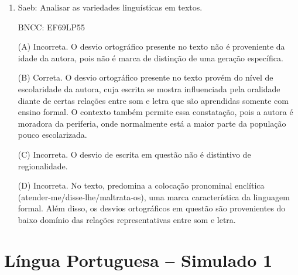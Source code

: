 \begin{enumerate}
\item

Saeb: Analisar as variedades linguísticas em textos.

BNCC: EF69LP55

(A) Incorreta. O desvio ortográfico presente no texto não é proveniente
da idade da autora, pois não é marca de distinção de uma geração
específica.

(B) Correta. O desvio ortográfico presente no texto provém do nível de
escolaridade da autora, cuja escrita se mostra influenciada pela
oralidade diante de certas relações entre som e letra que são aprendidas
somente com ensino formal. O contexto também permite essa constatação,
pois a autora é moradora da periferia, onde normalmente está a maior
parte da população pouco escolarizada.

(C) Incorreta. O desvio de escrita em questão não é distintivo de
regionalidade.

(D) Incorreta. No texto, predomina a colocação pronominal enclítica
(atender-me/disse-lhe/maltrata-os), uma marca característica da
linguagem formal. Além disso, os desvios ortográficos em questão são
provenientes do baixo domínio das relações representativas entre som e
letra.
\end{enumerate}

\section*{Língua Portuguesa – Simulado 1}

